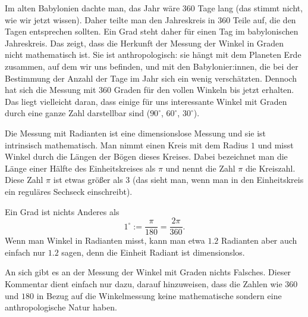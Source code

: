 \begin{bem} 
	Im alten Babylonien dachte man, das Jahr wäre 360 Tage lang (das stimmt nicht, wie wir jetzt wissen). Daher teilte man den Jahreskreis in 360 Teile auf, die den Tagen entsprechen sollten. Ein Grad steht daher für einen Tag im babylonischen Jahreskreis. Das zeigt, dass die Herkunft der Messung der Winkel in Graden nicht mathematisch ist. Sie ist anthropologisch: sie hängt mit dem Planeten Erde zusammen, auf dem wir uns befinden, und mit den Babylonier:innen, die bei der Bestimmung der Anzahl der Tage im Jahr sich ein wenig verschätzten. Dennoch hat sich die Messung mit 360 Graden für den vollen Winkeln bis jetzt erhalten. Das liegt vielleicht daran, dass einige für uns interessante Winkel mit Graden durch eine ganze Zahl darstellbar sind ($90^\circ$, $60^\circ$, $30^\circ$). 
	
	Die Messung mit Radianten ist eine dimensionslose Messung und sie ist intrinsisch mathematisch. Man nimmt einen Kreis mit dem Radius $1$ und misst Winkel durch die Längen der Bögen dieses Kreises. Dabei bezeichnet man die Länge einer Hälfte des Einheitskreises als $\pi$ und nennt die Zahl $\pi$ die Kreiszahl. Diese Zahl $\pi$ ist etwas größer als $3$ (das sieht man, wenn man in den Einheitskreis ein reguläres Sechseck einschreibt). 
	
	Ein Grad ist nichts Anderes als 
	\[
		1^\circ := \frac{\pi}{180}= \frac{2\pi}{360}.
	\] Wenn man Winkel in Radianten misst, kann man etwa $1{.}2$ Radianten aber auch einfach nur $1{.}2$ sagen, denn die Einheit Radiant ist dimensionslos. 
	
	An sich gibt es an der Messung der Winkel mit Graden nichts Falsches. Dieser Kommentar dient einfach nur dazu, darauf hinzuweisen, dass die Zahlen wie $360$ und $180$ in Bezug auf die Winkelmessung keine mathematische sondern eine anthropologische Natur haben.
\end{bem} 

